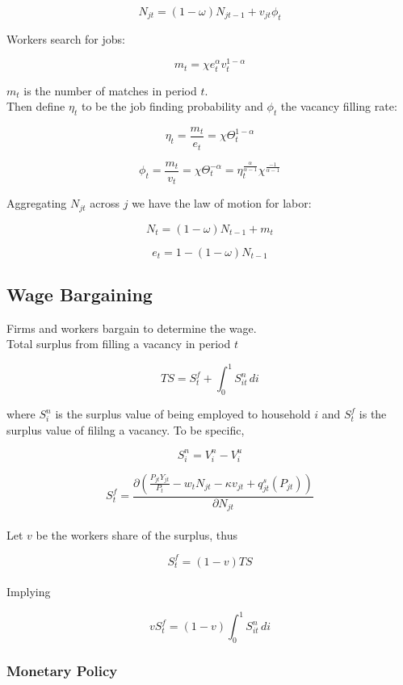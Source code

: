 \documentclass[titlepage]{\econtex}\providecommand{\texname}{Dissertation-Proposal}
\begin{document}
$$ N_{jt} = (1-\omega)N_{jt-1} + v_{jt} \phi_{t}$$

Workers search for jobs:

$$m_{t} = \chi e_{t}^{\alpha} v_{t}^{1-\alpha}$$

$m_{t}$ is the number of matches in period $t$.\\

Then define $\eta_{t}$ to be the job finding probability and $\phi_{t}$ the vacancy filling rate:

$$ \eta_{t} = \frac{m_{t}}{e_{t}} = \chi \Theta_{t}^{1-\alpha}$$

$$ \phi_{t} = \frac{m_{t}}{v_{t}} = \chi \Theta_{t}^{-\alpha} = \eta_{t}^{\frac{\alpha}{\alpha -1}} \chi^{\frac{-1}{\alpha - 1}}$$

Aggregating $N_{jt}$ across $j$ we have the law of motion for labor:

$$ N_{t} =  (1-\omega)N_{t-1} + m_{t} $$

$$ e_{t} = 1 - (1-\omega) N_{t-1} $$


\hypertarget{Wage Bargaining}{}
\subsection{Wage Bargaining}

Firms and workers bargain to determine the wage.\\

Total surplus from filling a vacancy in period $t$

$$ TS = S_{t}^{f} +  \int_{0}^{1} S_{it}^{n} \, di $$

where $ S_{i}^{n}$ is the surplus value of being employed to household $i$  and $ S_{t}^{f}$ is the surplus value of fililng a vacancy. To be specific,

$$ S_{i}^{n} = V_{i}^{n} - V_{i}^{u}$$


 $$ S_{t}^{f} = \frac{ \partial \left( \frac{P_{jt}Y_{jt}}{P_{t}} - w_{t} N_{jt} - \kappa v_{jt} + q^{s}_{jt}\left(P_{jt}\right)\right)}{\partial N_{jt}}$$ \\
 



Let $v$ be the workers share of the surplus, thus

 $$S_{t}^{f} = (1-v)TS $$ \\

Implying 

$$ vS_{t}^{f}  = (1-v)  \int_{0}^{1} S_{it}^{n} \, di $$

\hypertarget{Monetary Policy}{}
\subsubsection{Monetary Policy}
\end{document}
